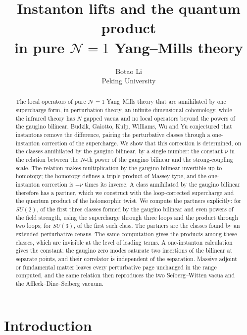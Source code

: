 \documentclass[11pt]{article}
\title{Instanton lifts and the quantum product\\ in pure $\mathcal N=1$ Yang--Mills theory}
\author{Botao Li\\[4pt]{\normalsize Peking University}}
\date{}
\numberwithin{equation}{section}
\numberwithin{figure}{section}
\numberwithin{table}{section}
\theoremstyle{definition}
\begin{document}
\maketitle
\begin{abstract}
The local operators of pure $\mathcal N=1$ Yang--Mills theory that are annihilated by one supercharge form, in perturbation theory, an infinite-dimensional cohomology, while the infrared theory has $N$ gapped vacua and no local operators beyond the powers of the gaugino bilinear. Budzik, Gaiotto, Kulp, Williams, Wu and Yu conjectured that instantons remove the difference, pairing the perturbative classes through a one-instanton correction of the supercharge. We show that this correction is determined, on the classes annihilated by the gaugino bilinear, by a single number: the constant $\nu$ in the relation between the $N$-th power of the gaugino bilinear and the strong-coupling scale. The relation makes multiplication by the gaugino bilinear invertible up to homotopy; the homotopy defines a triple product of Massey type, and the one-instanton correction is $-\nu$ times its inverse. A class annihilated by the gaugino bilinear therefore has a partner, which we construct with the loop-corrected supercharge and the quantum product of the holomorphic twist. We compute the partners explicitly: for $SU(2)$, of the first three classes formed by the gaugino bilinear and even powers of the field strength, using the supercharge through three loops and the product through two loops; for $SU(3)$, of the first such class. The partners are the classes found by an extended perturbative census. The same computation gives the products among these classes, which are invisible at the level of leading terms. A one-instanton calculation gives the constant: the gaugino zero modes saturate two insertions of the bilinear at separate points, and their correlator is independent of the separation. Massive adjoint or fundamental matter leaves every perturbative page unchanged in the range computed, and the same relation then reproduces the two Seiberg--Witten vacua and the Affleck--Dine--Seiberg vacuum.
\end{abstract}
{\small\setcounter{tocdepth}{2}\tableofcontents}
\bigskip

\section{Introduction}\label{sec-intro}
\end{document}
